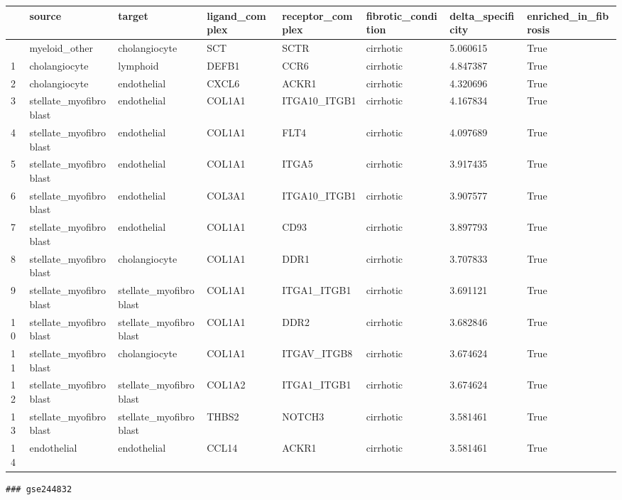 \documentclass[
  letterpaper,
  DIV=11,
  numbers=noendperiod]{scrartcl}
\newcounter{none} %
\begin{document}
{\def\LTcaptype{none} %
\begin{longtable}[]{@{}llllllll@{}}
\toprule\noalign{}
& source & target & ligand\_complex & receptor\_complex &
fibrotic\_condition & delta\_specificity & enriched\_in\_fibrosis \\
\midrule\noalign{}
\endhead
\bottomrule\noalign{}
\endlastfoot
0 & myeloid\_other & cholangiocyte & SCT & SCTR & cirrhotic & 5.060615 &
True \\
1 & cholangiocyte & lymphoid & DEFB1 & CCR6 & cirrhotic & 4.847387 &
True \\
2 & cholangiocyte & endothelial & CXCL6 & ACKR1 & cirrhotic & 4.320696 &
True \\
3 & stellate\_myofibroblast & endothelial & COL1A1 & ITGA10\_ITGB1 &
cirrhotic & 4.167834 & True \\
4 & stellate\_myofibroblast & endothelial & COL1A1 & FLT4 & cirrhotic &
4.097689 & True \\
5 & stellate\_myofibroblast & endothelial & COL1A1 & ITGA5 & cirrhotic &
3.917435 & True \\
6 & stellate\_myofibroblast & endothelial & COL3A1 & ITGA10\_ITGB1 &
cirrhotic & 3.907577 & True \\
7 & stellate\_myofibroblast & endothelial & COL1A1 & CD93 & cirrhotic &
3.897793 & True \\
8 & stellate\_myofibroblast & cholangiocyte & COL1A1 & DDR1 & cirrhotic
& 3.707833 & True \\
9 & stellate\_myofibroblast & stellate\_myofibroblast & COL1A1 &
ITGA1\_ITGB1 & cirrhotic & 3.691121 & True \\
10 & stellate\_myofibroblast & stellate\_myofibroblast & COL1A1 & DDR2 &
cirrhotic & 3.682846 & True \\
11 & stellate\_myofibroblast & cholangiocyte & COL1A1 & ITGAV\_ITGB8 &
cirrhotic & 3.674624 & True \\
12 & stellate\_myofibroblast & stellate\_myofibroblast & COL1A2 &
ITGA1\_ITGB1 & cirrhotic & 3.674624 & True \\
13 & stellate\_myofibroblast & stellate\_myofibroblast & THBS2 & NOTCH3
& cirrhotic & 3.581461 & True \\
14 & endothelial & endothelial & CCL14 & ACKR1 & cirrhotic & 3.581461 &
True \\
\end{longtable}
}

\begin{verbatim}
### gse244832
\end{verbatim}
\end{document}
